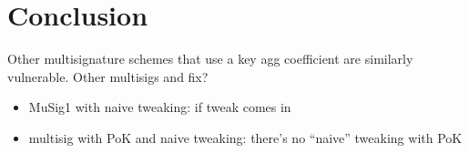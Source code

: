 \documentclass[a4paper,orivec,oribibl,english]{llncs}
\begin{document}
\section{Conclusion}
Other multisignature schemes that use a key agg coefficient are similarly vulnerable.
Other multisigs and fix?
\begin{itemize}
\item MuSig1 with naive tweaking: if tweak comes in
\item multisig with PoK and naive tweaking: there's no ``naive'' tweaking with PoK
\end{itemize}
\end{document}
